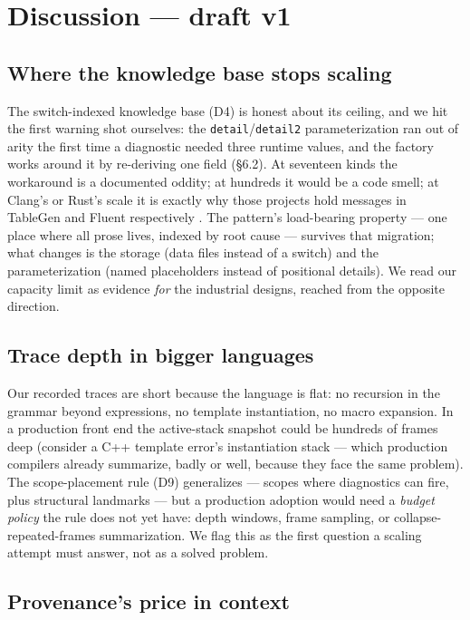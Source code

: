 \section{Discussion --- draft v1}
\label{sec:discussion}

\subsection{Where the knowledge base stops scaling}

The switch-indexed knowledge base (D4) is honest about its ceiling,
and we hit the first warning shot ourselves: the \texttt{detail}/\texttt{detail2}
parameterization ran out of arity the first time a diagnostic needed
three runtime values, and the factory works around it by re-deriving
one field (\S6.2). At seventeen kinds the workaround is a documented
oddity; at hundreds it would be a code smell; at Clang's or Rust's
scale it is exactly why those projects hold messages in TableGen and
Fluent respectively \cite{rustc-dev-guide,clang-internals}. The pattern's
load-bearing property --- one place where all prose lives, indexed by
root cause --- survives that migration; what changes is the storage
(data files instead of a switch) and the parameterization (named
placeholders instead of positional details). We read our capacity
limit as evidence \emph{for} the industrial designs, reached from the
opposite direction.

\subsection{Trace depth in bigger languages}

Our recorded traces are short because the language is flat: no
recursion in the grammar beyond expressions, no template
instantiation, no macro expansion. In a production front end the
active-stack snapshot could be hundreds of frames deep (consider a
C++ template error's instantiation stack --- which production
compilers already summarize, badly or well, because they face the
same problem). The scope-placement rule (D9) generalizes --- scopes
where diagnostics can fire, plus structural landmarks --- but a
production adoption would need a \emph{budget policy} the rule does not
yet have: depth windows, frame sampling, or collapse-repeated-frames
summarization. We flag this as the first question a scaling attempt
must answer, not as a solved problem.

\subsection{Provenance's price in context}

